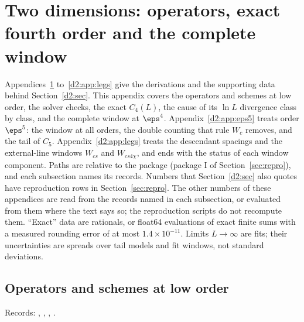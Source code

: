 \section{Two dimensions: operators, exact fourth order and the complete window}\label{d2:app:eps4}

Appendices~\ref{d2:app:eps4} to~\ref{d2:app:legs} give the derivations and the supporting data behind
Section~\ref{d2:sec}. This appendix covers the operators and schemes at low order, the solver checks, the exact $C_4(L)$,
the cause of its $\ln L$ divergence class by class, and the complete window at $\eps^4$. Appendix~\ref{d2:app:eps5}
treats order $\eps^5$: the window at all orders, the double counting that rule $W_c$ removes, and the tail of $C_5$.
Appendix~\ref{d2:app:legs} treats the descendant spacings and the external-line windows $W_{cs}$ and $W_{cs4\chi}$, and
ends with the status of each window component. Paths are relative to the package
 (package I of Section~\ref{sec:repro}), and each subsection names its
records. Numbers that Section~\ref{d2:sec} also quotes have reproduction rows in Section~\ref{sec:repro}. The other numbers
of these appendices are read from the records named in each subsection, or evaluated from them where the text says
so; the reproduction scripts do not recompute them. ``Exact'' data
are rationals, or float64 evaluations of exact finite sums with a measured rounding error of at most
$1.4\times10^{-11}$. Limits $L\to\infty$ are fits; their uncertainties are spreads over tail models and fit windows, not
standard deviations.

\subsection{Operators and schemes at low order}\label{d2:app:ops}
{\small\raggedright\noindent Records: , , ,
.\par}

